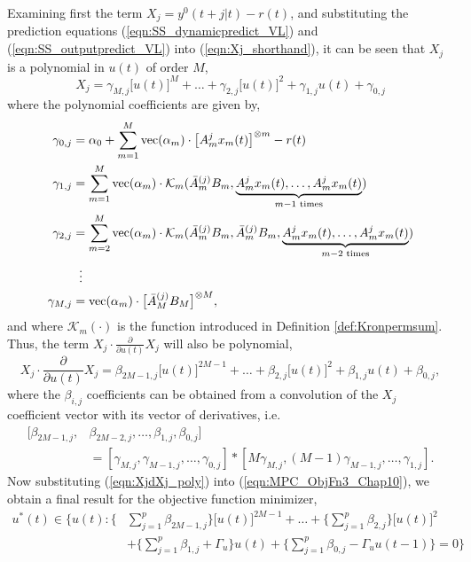 Examining first the term $X_j = y^0(t+j|t) - r(t)$, and substituting the prediction equations (\ref{eqn:SS_dynamicpredict_VL}) and (\ref{eqn:SS_outputpredict_VL}) into (\ref{eqn:Xj_shorthand}), it can be seen that $X_j$ is a polynomial in $u(t)$ of order $M$,
\begin{equation}
X_j = \gamma_{M,j} \big[ u(t) \big]^M + \hdots + \gamma_{2,j} \big[ u(t) \big]^2 + \gamma_{1,j} u(t) + \gamma_{0,j}
\end{equation}
where the polynomial coefficients are given by,
\begin{equation}
\begin{split}
\gamma_{0,j} &= \alpha_0 + \sum_{m=1}^M \operatorname{vec}(\alpha_m) \cdot \big[ A_m^j x_m(t) \big]^{\otimes m} - r(t)\\
\gamma_{1,j} &= \sum_{m=1}^M \operatorname{vec}(\alpha_m) \cdot \mathcal{K}_m (\bar{A}_m^{(j)}B_m,\underbrace{A_m^j x_m(t),\hdots,A_m^j x_m(t)}_{m-1 \text{ times}}) \\
\gamma_{2,j} &= \sum_{m=2}^M \operatorname{vec}(\alpha_m) \cdot \mathcal{K}_m (\bar{A}_m^{(j)}B_m, \bar{A}_m^{(j)}B_m, \underbrace{A_m^j x_m(t),\hdots,A_m^j x_m(t)}_{m-2 \text{ times}}) \\
& \; \; \vdots \\
\gamma_{M,j} &= \operatorname{vec}(\alpha_m) \cdot \big[ \bar{A}_M^{(j)}B_M \big]^{\otimes M},
\label{eqn:MPC_gammacoeffs}
\end{split}
\end{equation}
and where $\mathcal{K}_m(\cdot)$ is the function introduced in Definition \ref{def:Kronpermsum}. Thus, the term $X_j \cdot \frac{\partial}{\partial u(t)} X_j$ will also be polynomial,
\begin{equation}
X_j \cdot \frac{\partial}{\partial u(t)} X_j = \beta_{2M-1,j} \big[ u(t) \big]^{2M-1} + \hdots + \beta_{2,j} \big[ u(t) \big]^2 + \beta_{1,j} u(t) + \beta_{0,j},
\label{eqn:XjdXj_poly}
\end{equation}
where the $\beta_{i,j}$ coefficients can be obtained from a convolution of the $X_j$ coefficient vector with its vector of derivatives, i.e.
\begin{equation}
\begin{split}
[\beta_{2M-1,j} , &\beta_{2M-2,j} , \hdots ,\beta_{1,j} ,\beta_{0,j}] \\
&= [\gamma_{M,j} , \gamma_{M-1,j} , \hdots , \gamma_{0,j}] * [M \gamma_{M,j} , (M-1) \gamma_{M-1,j} , \hdots , \gamma_{1,j}].
\label{eqn:MPC_betacoeffs}
\end{split}
\end{equation} 
Now substituting (\ref{eqn:XjdXj_poly}) into (\ref{eqn:MPC_ObjFn3_Chap10}), we obtain a final result for the objective function minimizer,
\begin{equation}
\begin{split}
u^*(t) \in   \Bigg\{ u(t): \Big\{ &\sum_{j=1}^{p} \beta_{2M-1,j} \Big\} \big[ u(t) \big]^{2M-1} + \hdots + \Big\{ \sum_{j=1}^{p} \beta_{2,j} \Big\} \big[ u(t) \big]^2 \\
&+ \Big\{ \sum_{j=1}^{p} \beta_{1,j} + \Gamma_u \Big\} u(t) + \Big\{ \sum_{j=1}^{p} \beta_{0,j} - \Gamma_u u(t-1) \Big\} = 0 \Bigg\}
\label{eqn:MPC_finalminimizer}
\end{split}
\end{equation}

